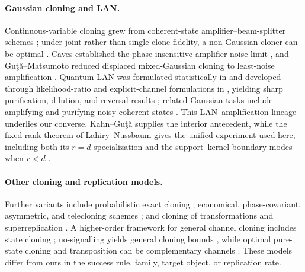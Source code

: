 \documentclass[11pt]{article}
\theoremstyle{remark}
\theoremstyle{plain}
\begin{document}
\paragraph{Gaussian cloning and LAN.}
Continuous-variable cloning grew from coherent-state amplifier--beam-splitter
schemes \cite{CerfIpeRottenberg2000,
BraunsteinCerfIblisdirVanLoockMassar2001}; under joint rather than single-clone
fidelity, a non-Gaussian cloner can be optimal
\cite{CerfKrugerNavezWernerWolf2005}.  Caves established the
phase-insensitive amplifier noise limit \cite{Caves1982LinearAmplifiers}, and
Gu{\c t}{\u a}--Matsumoto reduced displaced mixed-Gaussian cloning to
least-noise amplification \cite{GutaMatsumoto2006MixedGaussianCloning}.
Quantum LAN was formulated statistically in \cite{GutaJencova2007LAN} and
developed through likelihood-ratio and explicit-channel formulations in
\cite{YamagataFujiwaraGill2013LAN,GutaKahn2006LANQubits,
KahnGuta2009LANFiniteDimensional}, yielding sharp purification, dilution, and
reversal results \cite{BowlesGutaAdesso2011Purification,
BowlesGutaAdesso2012Reversal}; related Gaussian tasks include amplifying and
purifying noisy coherent states \cite{ZhaoChiribella2017}.  This
LAN--amplification lineage underlies our converse.
Kahn--Gu{\c t}{\u a} supplies the interior antecedent, while the
fixed-rank theorem of Lahiry--Nussbaum gives the unified experiment used
here, including both its \(r=d\) specialization and the support--kernel
boundary modes when \(r<d\)
\cite{KahnGuta2009LANFiniteDimensional,LahiryNussbaum2024}.

\paragraph{Other cloning and replication models.}
Further variants include probabilistic exact cloning \cite{DuanGuo1998};
economical, phase-covariant, asymmetric, and telecloning schemes
\cite{NiuGriffiths1998,BrussCinchettiDArianoMacchiavello2000,
Cerf2000Asymmetric,MuraoJonathanPlenioVedral1999}; and cloning of
transformations and superreplication
\cite{ChiribellaDArianoPerinotti2008,ChiribellaYangYao2013,
GendraCalsamigliaMunozTapiaBaganChiribella2014,
DurSekatskiSkotiniotis2015,ChiribellaYangHuang2015,
ChiribellaYang2016}.  A higher-order framework for general channel cloning
includes state cloning \cite{SekatskiGuryanovaKothakondaSkotiniotis2025};
no-signalling yields general cloning bounds
\cite{SekatskiSkotiniotisDur2015NoSignaling,HuTomamichel2024}, while optimal
pure-state cloning and transposition can be complementary channels
\cite{BrzicGrinkoStudzinskiQuintino2026}.  These models differ from ours in
the success rule, family, target object, or replication rate.
\end{document}
